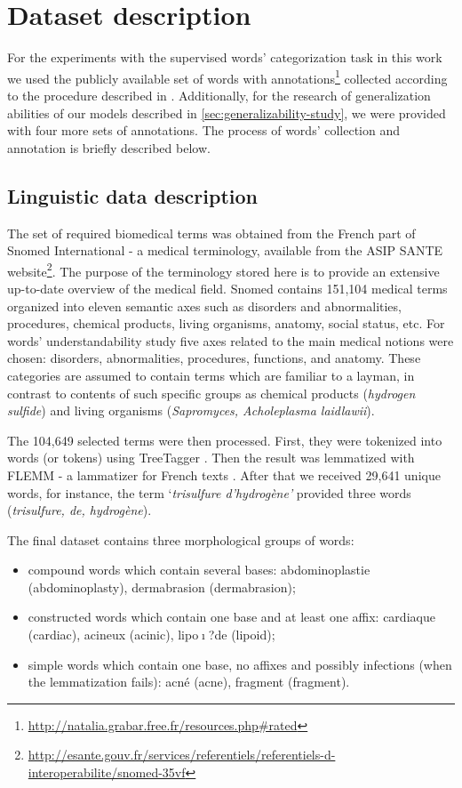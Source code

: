 \chapter{Dataset description}
\label{ch:dataset-description}

For the experiments with the supervised words' categorization task in this work we used the publicly available set of words with annotations\footnote{\url{http://natalia.grabar.free.fr/resources.php\#rated}} collected according to the procedure described in \citep{Grabar-PITR2014}. Additionally, for the research of generalization abilities of our models described in \ref{sec:generalizability-study}, we were provided with four more sets of annotations.
The process of words' collection and annotation is briefly described below.

\section{Linguistic data description}
\label{sec:linguistic-data-description}

The set of required biomedical terms was obtained from the French part of Snomed International \citep{Cote-93} - a medical terminology, available from the ASIP SANTE website\footnote{\url{http://esante.gouv.fr/services/referentiels/referentiels-d-interoperabilite/snomed-35vf}}. The purpose of the terminology stored here is to provide an extensive up-to-date overview of the medical field. Snomed contains 151,104 medical terms organized into eleven semantic axes such as disorders and abnormalities, procedures, chemical products, living organisms, anatomy, social status, etc. For words' understandability study five axes related to the main medical notions were chosen: disorders, abnormalities, procedures, functions, and anatomy. These categories are assumed to contain terms which are familiar to a layman, in contrast to contents of such specific groups as chemical products (\textit{hydrogen sulfide}) and living organisms (\textit{Sapromyces, Acholeplasma laidlawii}).

The 104,649 selected terms were then processed. First, they were tokenized into words (or tokens) using TreeTagger \citep{Schmid-1994}. Then the result was lemmatized with FLEMM - a lammatizer for French texts \citep{Namer-TAL2000}. After that we received 29,641 unique words, for instance, the term `\textit{trisulfure d'hydrog\`{e}ne'} provided three words (\textit{trisulfure, de, hydrog\`{e}ne}).

The final dataset contains three morphological groups of words:
\begin{itemize}
    \item  compound words which contain several bases: abdominoplastie (abdominoplasty), dermabrasion (dermabrasion);
    \item  constructed words which contain one base and at least one affix: cardiaque (cardiac), acineux (acinic), lipo$\mathrm{\imath}$?de (lipoid);
    \item  simple words which contain one base, no affixes and possibly infections (when the lemmatization fails): acn\'{e} (acne), fragment (fragment).
\end{itemize}

